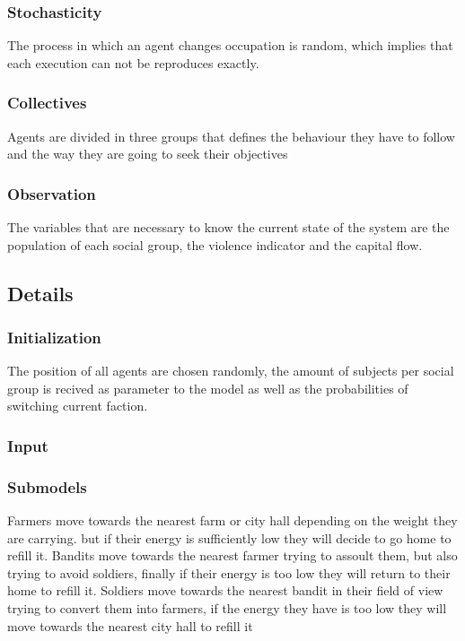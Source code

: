 \documentclass{wscpaperproc}
\theoremstyle{wsc}
\begin{document}
\subsubsection{Stochasticity}

The process in which an agent changes occupation is random, which implies that
each execution can not be reproduces exactly.

\subsubsection{Collectives}

Agents are divided in three groups that defines the behaviour they have to
follow and the way they are going to seek their objectives

\subsubsection{Observation}

The variables that are necessary to know the current state of the system are
the population of each social group, the violence indicator and the capital
flow.

\subsection{Details}

\subsubsection{Initialization}

The position of all agents are chosen randomly, the amount of subjects per
social group is recived as parameter to the model as well as the probabilities
of switching current faction.

\subsubsection{Input}

\subsubsection{Submodels}

Farmers move towards the nearest farm or city hall depending on the weight they
are carrying. but if their energy is sufficiently low they will decide to go
home to refill it. Bandits move towards the nearest farmer trying to assoult
them, but also trying to avoid soldiers, finally if their energy is too low
they will return to their home to refill it. Soldiers move towards the nearest
bandit in their field of view trying to convert them into farmers, if the
energy they have is too low they will move towards the nearest city hall to
refill it



\end{document}
